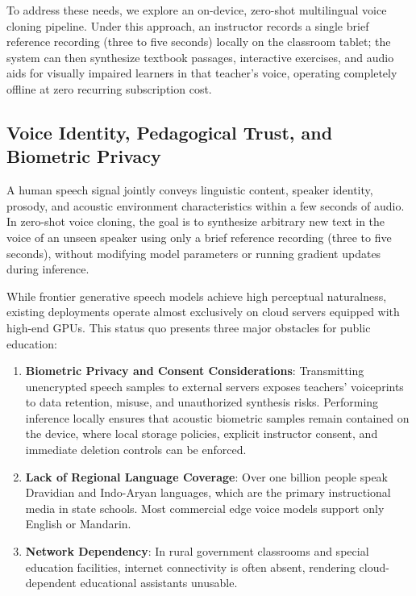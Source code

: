 To address these needs, we explore an on-device, zero-shot multilingual voice cloning pipeline. Under this approach, an instructor records a single brief reference recording (three to five seconds) locally on the classroom tablet; the system can then synthesize textbook passages, interactive exercises, and audio aids for visually impaired learners in that teacher's voice, operating completely offline at zero recurring subscription cost.

\subsection{Voice Identity, Pedagogical Trust, and Biometric Privacy}
A human speech signal jointly conveys linguistic content, speaker identity, prosody, and acoustic environment characteristics within a few seconds of audio. In zero-shot voice cloning, the goal is to synthesize arbitrary new text in the voice of an unseen speaker using only a brief reference recording (three to five seconds), without modifying model parameters or running gradient updates during inference.

While frontier generative speech models achieve high perceptual naturalness, existing deployments operate almost exclusively on cloud servers equipped with high-end GPUs. This status quo presents three major obstacles for public education:
\begin{enumerate}[label=(\roman*)]
    \item \textbf{Biometric Privacy and Consent Considerations}: Transmitting unencrypted speech samples to external servers exposes teachers' voiceprints to data retention, misuse, and unauthorized synthesis risks. Performing inference locally ensures that acoustic biometric samples remain contained on the device, where local storage policies, explicit instructor consent, and immediate deletion controls can be enforced.
    \item \textbf{Lack of Regional Language Coverage}: Over one billion people speak Dravidian and Indo-Aryan languages, which are the primary instructional media in state schools. Most commercial edge voice models support only English or Mandarin.
    \item \textbf{Network Dependency}: In rural government classrooms and special education facilities, internet connectivity is often absent, rendering cloud-dependent educational assistants unusable.
\end{enumerate}

